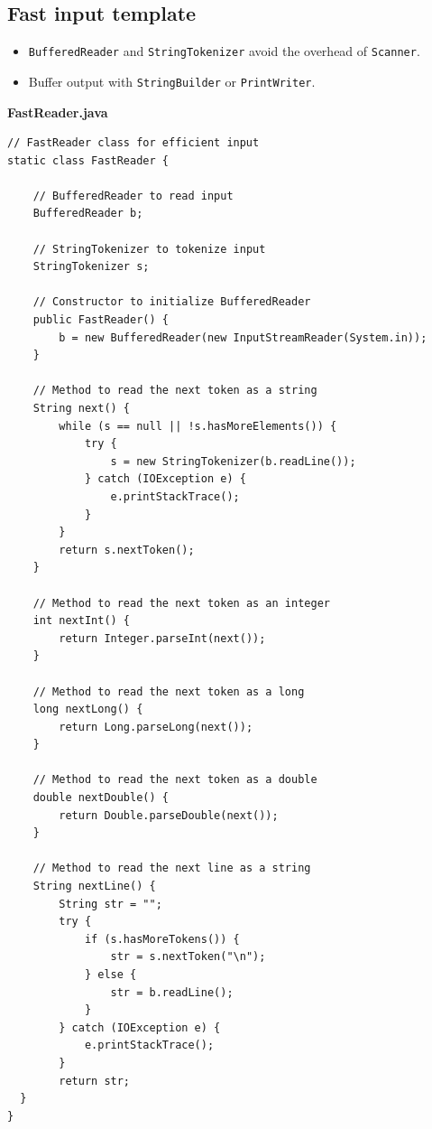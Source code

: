 \documentclass[10pt]{article}
\newcommand{\code}[1]{\texttt{#1}}
\begin{document}
\subsection{Fast input template}
\begin{itemize}
  \item \code{BufferedReader} and \code{StringTokenizer} avoid the overhead of \code{Scanner}.
  \item Buffer output with \code{StringBuilder} or \code{PrintWriter}.
\end{itemize}
\begin{framed}
\noindent\textbf{FastReader.java}\par\smallskip
\scriptsize
\setlength{\baselineskip}{7.2pt}
\begin{verbatim}
// FastReader class for efficient input
static class FastReader {
  
    // BufferedReader to read input
    BufferedReader b;
  
    // StringTokenizer to tokenize input
    StringTokenizer s; 

    // Constructor to initialize BufferedReader
    public FastReader() {
        b = new BufferedReader(new InputStreamReader(System.in));
    }

    // Method to read the next token as a string
    String next() {
        while (s == null || !s.hasMoreElements()) {
            try {
                s = new StringTokenizer(b.readLine());
            } catch (IOException e) {
                e.printStackTrace(); 
            }
        }
        return s.nextToken();
    }

    // Method to read the next token as an integer
    int nextInt() { 
        return Integer.parseInt(next()); 
    }

    // Method to read the next token as a long
    long nextLong() { 
        return Long.parseLong(next()); 
    }

    // Method to read the next token as a double
    double nextDouble() { 
        return Double.parseDouble(next()); 
    }

    // Method to read the next line as a string
    String nextLine() {
        String str = "";
        try {
            if (s.hasMoreTokens()) {
                str = s.nextToken("\n");
            } else {
                str = b.readLine();
            }
        } catch (IOException e) {
            e.printStackTrace(); 
        }
        return str;
  }
}
\end{verbatim}
\end{framed}
\end{document}
